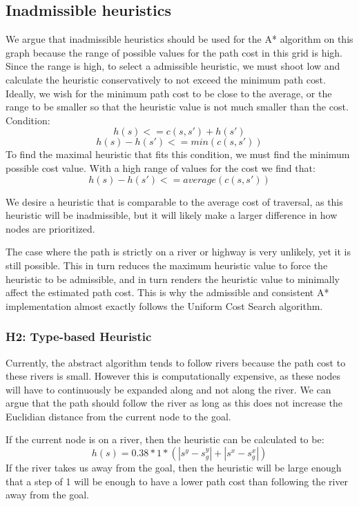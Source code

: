 \subsection{Inadmissible heuristics}
We argue that inadmissible heuristics should be used for the A* algorithm on this graph because the range of possible values for the path cost in this grid is high. Since the range is high, to select a admissible heuristic, we must shoot low and calculate the heuristic conservatively to not exceed the minimum path cost. Ideally, we wish for the minimum path cost to be close to the average, or the range to be smaller so that the heuristic value is not much smaller than the cost.
Condition:
\[h(s) <= c(s,s') + h(s') \]
\[h(s) - h(s') <= min(c(s,s'))\]
To find the maximal heuristic that fits this condition, we must find the minimum possible cost value.
With a high range of values for the cost we find that:
\[h(s) - h(s') <= average(c(s,s'))\]

We desire a heuristic that is comparable to the average cost of traversal, as this heuristic will be inadmissible, but it will likely make a larger difference in how nodes are prioritized.

The case where the path is strictly on a river or highway is very unlikely, yet it is still possible. This in turn reduces the maximum heuristic value to force the heuristic to be admissible, and in turn renders the heuristic value to minimally affect the estimated path cost. This is why the admissible and consistent A* implementation almost exactly follows the Uniform Cost Search algorithm.

\subsubsection{H2: Type-based Heuristic}
Currently, the abstract algorithm tends to follow rivers because the path cost to these rivers is small. However this is computationally expensive, as these nodes will have to continuously be expanded along and not along the river. We can argue that the path should follow the river as long as this does not increase the Euclidian distance from the current node to the goal.

If the current node is on a river, then the heuristic can be calculated to be:
\[h(s) = 0.38 * 1 * ( |s^y - s_g^y| + |s^x - s_g^x| )\]
If the river takes us away from the goal, then the heuristic will be large enough that a step of 1 will be enough to have a lower path cost than following the river away from the goal.

